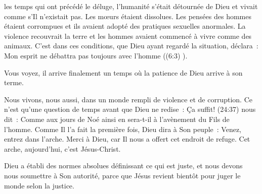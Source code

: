 



 les temps qui ont précédé le déluge, l'humanité s'était
 détournée de Dieu et vivait comme s'Il n'existait pas. Les mœurs étaient
 dissolues. Les pensées des hommes étaient corrompues et ils avaient adopté
 des pratiques sexuelles anormales. La violence recouvrait la terre et les
 hommes avaient commencé à vivre comme des animaux. C'est dans ces conditions,
 que Dieu ayant regardé la situation, déclara~: \og Mon esprit ne débattra pas
 toujours avec l'homme \fg{} ((6:3) \KJF{}). 

Vous voyez, il arrive finalement un temps où la patience de Dieu arrive à son terme. 

Nous vivons, nous aussi, dans un monde rempli de violence et de corruption.
 Ce n'est qu'une question de temps avant que Dieu ne redise~: \og Ça suffit! \fg{} 
 (24:37) nous dit~: \og Comme aux jours de Noé ainsi en sera-t-il
 à l'avènement du Fils de l'homme.\fg{} Comme Il l'a fait la première fois, Dieu
 dira à Son peuple~: \og Venez, entrez dans l'arche. \fg{} Merci à Dieu, car Il
 nous a offert cet endroit de refuge. Cet arche, aujourd'hui, c'est Jésus-Christ.



Dieu a établi des normes absolues définissant ce qui est juste, et nous devons
 nous soumettre à Son autorité, parce que Jésus revient bientôt pour juger le
 monde selon la justice.

\dvrule




